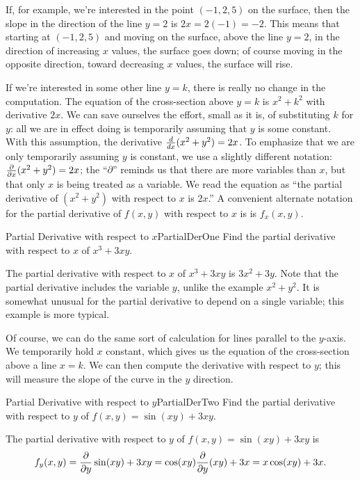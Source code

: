 If, for example, we're interested in the point $(-1,2,5)$ on the surface, then
the slope in the direction of the line $y=2$ is $2x=2(-1)=-2$. This
means that starting at $(-1,2,5)$ and moving on the surface, above the
line $y=2$, in the direction of increasing $x$ values, the surface
goes down; of course moving in the opposite direction, toward
decreasing $x$ values, the surface will rise.

If we're interested in some other line $y=k$, there is really no
change in the computation. The equation of the cross-section above
$y=k$ is $x^2+k^2$ with derivative $2x$. We can save ourselves the
effort, small as it is, of substituting $k$ for $y$: all we are in
effect doing is temporarily assuming that $y$ is some constant. With
this assumption, the derivative ${d\over dx}(x^2+y^2)=2x$. To
emphasize that we are only temporarily assuming $y$ is constant, we
use a slightly different notation: ${\partial\over \partial
  x}(x^2+y^2)=2x$; the ``$\partial$'' reminds us that there are more
variables than $x$, but that only $x$ is being treated as a variable.
We read the equation as ``the partial derivative of $(x^2+y^2)$ with
respect to $x$ is $2x$.'' A convenient alternate notation for the
partial derivative of $f(x,y)$ with respect to $x$ is
is $f_x(x,y)$.

\begin{example}{Partial Derivative with respect to $x$}{PartialDerOne}
Find the partial derivative with respect to $x$ of $x^3+3xy$.
\end{example}
\begin{solution}
The partial derivative with respect to $x$ of 
$x^3+3xy$ is $3x^2+3y$. Note that the partial derivative includes the
variable $y$, unlike the example $x^2+y^2$. It is somewhat unusual for
the partial derivative to depend on a single variable; this example is
more typical.
\end{solution}

Of course, we can do the same sort of calculation for lines parallel
to the $y$-axis. We temporarily hold $x$ constant, which gives us the
equation of the cross-section above a line $x=k$. We can then compute
the derivative with respect to $y$; this will measure the slope of
the curve in the $y$ direction.

\begin{example}{Partial Derivative with respect to $y$}{PartialDerTwo}
Find the partial derivative with respect to $y$ of $f(x,y)=\sin(xy)+3xy$.
\end{example}
\begin{solution}
The partial derivative with respect to $y$ of 
$f(x,y)=\sin(xy)+3xy$ is 
$$f_y(x,y)={\partial\over\partial y}\sin(xy)+3xy=\cos(xy){\partial\over\partial
  y}(xy)+ 3x=x\cos(xy)+3x.
$$
\end{solution}

